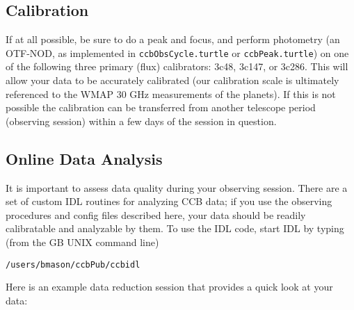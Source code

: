 \subsection{Calibration}

If at all possible, be sure to do a peak and focus, and perform
photometry (an OTF-NOD, as implemented in {\tt ccbObsCycle.turtle} or
{\tt ccbPeak.turtle}) on one of the following three primary (flux)
calibrators: 3c48, 3c147, or 3c286. This will allow your data to be
accurately calibrated (our calibration scale is ultimately referenced
to the WMAP 30 GHz measurements of the planets). If this is not
possible the calibration can be transferred from another telescope
period (observing session) within a few days of the session in
question.

\subsection{Online Data Analysis}
\label{sec:onlineanalys}

It is important to assess data quality during your observing session.
There are a set of custom IDL routines for analyzing CCB data; if you
use the observing procedures and config files described here, your
data should be readily calibratable and analyzable by them. To
use the IDL code, start IDL by typing (from the GB UNIX command line)
\begin{lstlisting}
/users/bmason/ccbPub/ccbidl
\end{lstlisting}

Here is an example data reduction session that provides a quick look at your data:

